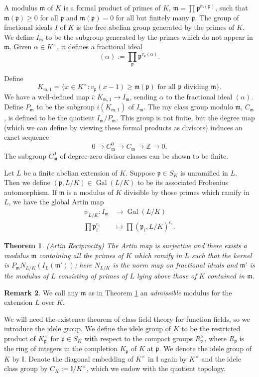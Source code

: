 \documentclass[12pt,reqno]{amsart}
\newcommand{\mm}{\mathfrak{m}}
\newcommand{\ZZ}{\mathbb{Z}}
\newcommand{\pp}{\mathfrak{p}}
\newcommand{\II}{\mathbb{I}}
\DeclareMathOperator{\Gal}{Gal}
\newtheorem{thm}{Theorem}[section]
\theoremstyle{definition}
\newtheorem{rmk}[thm]{Remark}
\begin{document}
A modulus $\mm$ of $K$ is a formal product of primes of $K$,
$\mm= \prod \pp^{\mm(\pp)}$, such that $\mm(\pp)\geq0$ for all $\pp$
and $\mm(\pp)=0$ for all but finitely many $\pp$. The group of
fractional ideals $I$ of $K$ is the free abelian group generated by
the primes of $K$. We define $I_{\mm}$ to be the subgroup generated by
the primes which do not appear in $\mm$. Given $\alpha\in K^{\times}$,
it defines a fractional ideal
\[
(\alpha):=\prod_{\pp}\pp^{v_{\pp}(\alpha)}.
\]


Define
\[
K_{\mm,1}=\{x\in K^{\times}: v_{\pp}(x-1)\geq \mm(\pp)
\text{ for all }\pp \text{ dividing } \mm\}.
\]
We have a well-defined map $i: K_{\mm,1}\to I_{\mm}$, sending $\alpha$
to  the fractional ideal $(\alpha)$. Define $P_{\mm}$ to be the subgroup $i(K_{\mm,1})$ of
$I_{\mm}$. The ray class
group modulo $\mm$, $C_{\mm}$, is defined to be the quotient $I_{\mm}/P_{\mm}$. This
group is not finite, but the degree map (which we can define by
viewing these formal products as divisors) induces an exact sequence
\[
0\to C^0_{\mm}\to C_{\mm}\to \ZZ\to 0.
\]
 The subgroup $C^0_{\mm}$ of degree-zero divisor classes can be shown to be finite. 

Let $L$ be a finite abelian extension of $K$. Suppose $\pp\in S_K$ is 
unramified in $L$. Then we define $(\pp,L/K)\in \Gal(L/K)$ to be its
associated Frobenius automorphism. If $\mm$ is a modulus of $K$
divisible by those primes which ramify in $L$, we have the global
Artin map
\begin{align*}
\psi_{L/K}: I_{\mm} &\to \Gal(L/K) \\
\prod \pp_i^{e_i} &\mapsto \prod (\pp_i,L/K)^{e_i}.
\end{align*}


\begin{thm}\label{Arep}(Artin Reciprocity)
  The Artin map is surjective and there exists a modulus $\mm$
  containing all the primes of $K$ which ramify in $L$ such that the kernel is
  $P_{\mm}N_{L/K}(I_L(\mm'))$; here $N_{L/K}$ is the norm map on
  fractional ideals and $\mm'$ is the modulus of $L$
   consisting of primes of $L$ lying above those of $K$ contained in $\mm$.
\end{thm}

\begin{rmk}We call any $\mm$ as in Theorem \ref{Arep} an
  {\em admissible} modulus for the extension $L$ over $K$.
\end{rmk}




We will need the existence theorem of class field theory for function
fields, so we introduce the idele group. We define the idele group of
$K$ to be the restricted product of $K_{\pp}^{\times}$ for
$\pp\in S_K$ with respect to the compact groups $R_{\pp}^{\times}$,
where $R_{\pp}$ is the ring of integers in the completion $K_{\pp}$ of
$K$ at $\pp$. We denote the idele group of $K$ by $\II$.  Denote the
diagonal embedding of $K^{\times}$ in $\II$ again by $K^{\times}$ and
the idele class group by $C_K:=\II/K^{\times}$, which we endow with
the quotient topology.
\end{document}
